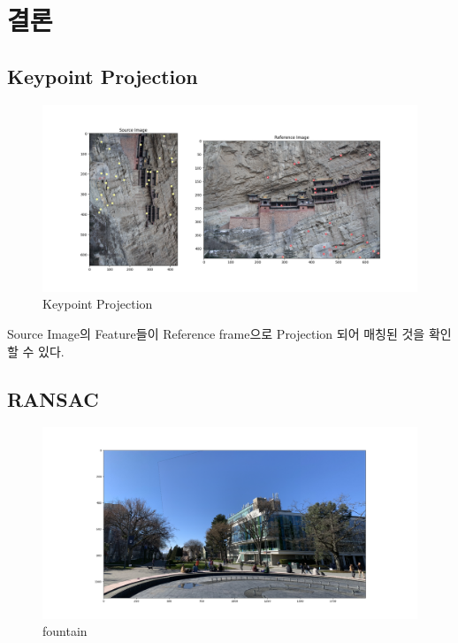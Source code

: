 \documentclass[]{report}
\begin{document}
\chapter{결론}

\section{Keypoint Projection}

\begin{figure}[ht!]
	\centering
	\includegraphics[width=1\textwidth]{image/Hanging1-Hanging2.png}
	\caption{Keypoint Projection}
	\label{Hanging1-Hanging2}
\end{figure}

Source Image의 Feature들이 Reference frame으로 Projection 되어 매칭된 것을 확인할 수 있다. \\


\section{RANSAC}

\begin{figure}[ht!]
	\centering
	\includegraphics[width=1\textwidth]{image/fountain4-fountain0.png}
	\caption{fountain}
	\label{fountain4-fountain0}
\end{figure}
\end{document}

